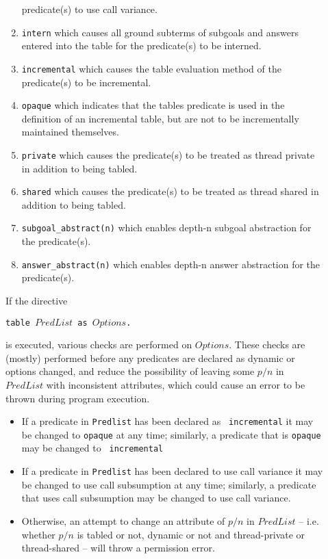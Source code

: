 \begin{description}
\begin{enumerate}
  predicate(s) to use call variance.
%
\item {\tt intern} which causes all ground subterms of subgoals and 
answers entered into the table for the predicate(s) to be interned.
%
\item {\tt incremental} which causes the table evaluation method of
  the predicate(s) to be incremental.
%
\item {\tt opaque} which indicates that the tables predicate is used
  in the definition of an incremental table, but are not to be
  incrementally maintained themselves.  
%
\item {\tt private} which causes the predicate(s) to be treated as
  thread private in addition to being tabled.
%
\item {\tt shared} which causes the predicate(s) to be treated as
  thread shared in addition to being tabled.
%
\item {\tt subgoal\_abstract(n)}  which enables depth-n subgoal abstraction for the predicate(s).
%
\item {\tt answer\_abstract(n)} which enables depth-n answer
  abstraction for the predicate(s).
%
\ei
\ei
\end{enumerate}

If the directive 

{\tt  table $PredList$ as $Options$.}

is executed, various checks are performed on $Options$.  These checks
are (mostly) performed before any predicates are declared as dynamic
or options changed, and reduce the possibility of leaving some $p/n$
in $PredList$ with inconsistent attributes, which could cause an error
to be thrown during program execution.
%
\begin{itemize}
\item If a predicate in {\tt Predlist} has been declared as {\tt
  incremental} it may be changed to {\tt opaque} at any time;
  similarly, a predicate that is {\tt opaque} may be changed to {\tt
    incremental}
%
\item If a predicate in {\tt Predlist} has been declared to use call
  variance it may be changed to use call subsumption at any time;
  similarly, a predicate that uses call subsumption may be changed to
  use call variance.
%
\item Otherwise, an attempt to change an attribute of $p/n$ in
  $PredList$ -- i.e. whether $p/n$ is tabled or not, dynamic or not
  and thread-private or thread-shared -- will throw a permission
  error.  
\end{itemize}


\end{description}
